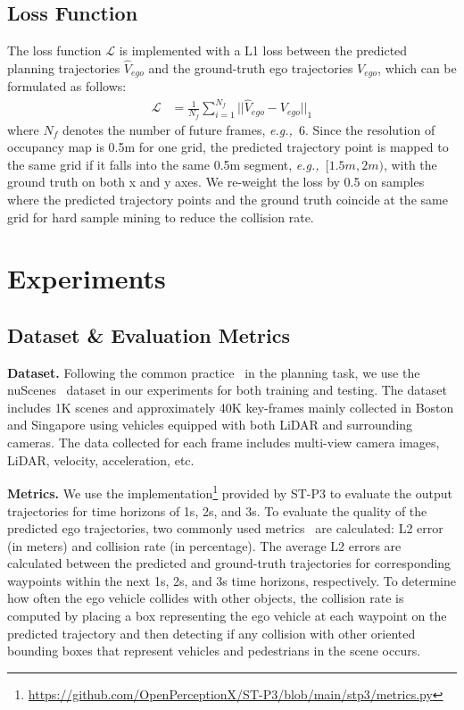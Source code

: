 \documentclass[10pt,twocolumn,letterpaper]{article}
\def\eg{\emph{e.g.,~}}
\newcommand{\myPara}[1]{\vspace{.05in}\noindent\textbf{#1.}\quad}
\begin{document}
\subsection{Loss Function}
The loss function $\mathcal{L}$ is implemented with a L1 loss between the predicted planning trajectories $\hat{V}_{ego}$ and the ground-truth ego trajectories $V_{ego}$, which can be formulated as follows: 
\begin{equation}
  \begin{aligned}
    \label{eqn:cel}
    \mathcal{L} &=   \frac{1}{N_f} \sum_{i=1}^{N_f} ||\hat{V}_{ego}-V_{ego}||_1
  \end{aligned}
\end{equation}
where $N_f$ denotes the number of future frames, \eg{6}. 
Since the resolution of occupancy map is 0.5m for one grid, the predicted trajectory point is mapped to the same grid if it falls into the same 0.5m segment, \eg{$[1.5m,2m)$}, with the ground truth on both x and y axes. 
We re-weight the loss by 0.5 on samples where the predicted trajectory points and the ground truth coincide at the same grid for hard sample mining to reduce the collision rate. 



\section{Experiments}
\subsection{Dataset \& Evaluation Metrics}
\myPara{Dataset} 
Following the common practice~\cite{hu2022st,hu2022goal,jiang2023vad}
in the planning task,
we use the nuScenes~\cite{caesar2020nuscenes}
dataset in our experiments for both training and testing.
The dataset includes 1K scenes and approximately 40K key-frames 
mainly collected in Boston and Singapore 
using vehicles equipped with both LiDAR and surrounding cameras. 
The data collected for each frame includes multi-view camera images, LiDAR, velocity, acceleration, etc.


\myPara{Metrics}
We use the implementation\footnote{\url{https://github.com/OpenPerceptionX/ST-P3/blob/main/stp3/metrics.py}} provided by ST-P3\cite{hu2022st} to evaluate the output trajectories for time horizons of 1s, 2s, and 3s. 
To evaluate the quality of the predicted ego trajectories, 
two commonly used metrics~\cite{hu2022st,hu2022goal,jiang2023vad} are calculated: 
L2 error (in meters) and collision rate (in percentage).
The average L2 errors are calculated between the predicted and ground-truth trajectories for corresponding waypoints within the next 1s, 2s, and 3s time horizons, respectively. 
To determine how often the ego vehicle 
collides with other objects, 
the collision rate is computed by 
placing a box representing the ego vehicle at each waypoint on the predicted trajectory 
and then detecting if any collision with other oriented bounding boxes that represent vehicles and pedestrians in the scene occurs.
\end{document}
